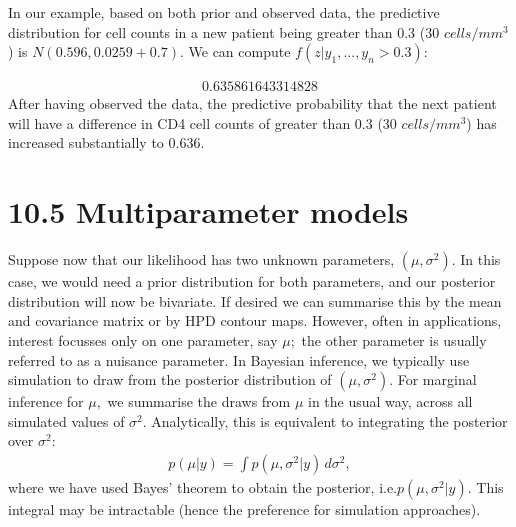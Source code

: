 \documentclass[letterpaper,10pt,english]{jupyterBook}
\begin{document}
\sphinxAtStartPar
In our example, based on both prior and observed data, the predictive distribution for cell counts in a new patient being greater than 0.3 (30 \(cells/mm^3\)) is \(N(0.596, 0.0259 + 0.7)\). We can compute \(f(z | y_1, ..., y_n > 0.3)\):

\begin{sphinxVerbatim}[commandchars=\\\{\}]
   
\end{sphinxVerbatim}
\begin{equation*}
\begin{split}0.635861643314828\end{split}
\end{equation*}
\sphinxAtStartPar
After having observed the data, the predictive probability that the next patient will have a difference in CD4 cell counts of greater than 0.3 (30 \(cells/mm^3\)) has increased substantially to 0.636.


\section{10.5 Multiparameter models}
\label{\detokenize{10.f. Bayesian Statistics II:multiparameter-models}}\label{\detokenize{10.f. Bayesian Statistics II::doc}}
\sphinxAtStartPar
Suppose now that our likelihood has two unknown parameters, \((\mu,\sigma^2).\) In this case, we would need a prior distribution for both parameters, and our posterior distribution will now be bivariate. If desired we can summarise this by the mean and covariance matrix or by HPD contour maps. However, often in applications, interest focusses only on one parameter, say \(\mu;\) the other parameter is usually referred to as a nuisance parameter. In Bayesian inference, we typically use simulation to draw from the posterior distribution of \((\mu,\sigma^2).\) For marginal inference for \(\mu,\) we summarise the draws from \(\mu\) in the usual way, across all simulated values of \(\sigma^2\). Analytically, this is equivalent to integrating the posterior over \(\sigma^2\):
\begin{equation*}
\begin{split}
p(\mu | y) = \int p(\mu,\sigma^2 |y) \, d\sigma^2,
\end{split}
\end{equation*}
\sphinxAtStartPar
where we have used Bayes’ theorem to obtain the posterior, i.e.\(p(\mu,\sigma^2 |y).\) This integral may be intractable (hence the preference for simulation approaches).
\end{document}
